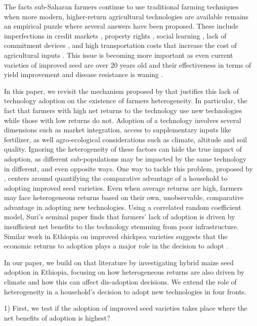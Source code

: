 \documentclass{article}
\begin{document}
The facts sub-Saharan farmers continue to use traditional farming techniques when more modern, higher-return agricultural technologies are available remains an empirical puzzle where several answers have been proposed. These include imperfections in credit markets \citep{Croppenstedt2003-pq}, property rights \citep{Place2000-el}, social learning \citep{Conley2010-ue,Foster1995-bz,Munshi2004-og}, lack of commitment devices \cite{Duflo2009-iv}, and high transportation costs that increase the cost of agricultural inputs \citep{Byerlee2013-qk}. This issue is becoming more important as even current varieties of improved seed are over 20 years old and their effectiveness in terms of yield improvement and disease resistance is waning \citep{Abate2015-rj}. 

In this paper, we revisit the mechanism proposed by  \citep{Suri2011-oi} that justifies this lack of technology adoption on the existence of farmers heterogeneity. In particular, the fact that farmers with high net returns to the technology use new technologies while those with low returns do not. Adoption of a technology involves several dimensions such as market integration, access to supplementary inputs like fertilizer, as well agro-ecological considerations such as climate, altitude and soil quality. Ignoring the heterogeneity of these factors can hide the true impact of adoption, as different sub-populations may be impacted by the same technology in different, and even opposite ways. One way to tackle this problem, proposed by \citep{Suri2011-oi}, centers around quantifying the comparative advantage of a household to adopting improved seed varieties. Even when average returns are high, farmers may face heterogeneous returns based on their own, unobservable, comparative advantage in adopting new technologies. Using a correlated random coefficient model, Suri’s seminal paper finds that farmers’ lack of adoption is driven by insufficient net benefits to the technology stemming from poor infrastructure. Similar work in Ethiopia on improved chickpea varieties suggests that the economic returns to adoption plays a major role in the decision to adopt \citep{Michler2018-wk}.

In our paper, we build on that literature by investigating hybrid maize seed adoption in Ethiopia, focusing on how heterogeneous returns are also driven by climate and how this can affect dis-adoption decisions. We extend the role of heterogeneity in a household’s decision to adopt new technologies in four fronts. 

1) First, we test if the adoption of improved seed varieties takes place where the net benefits of adoption is highest? 
\end{document}
